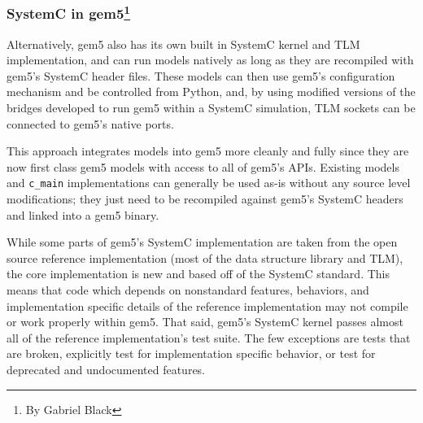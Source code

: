 \subsubsection[SystemC in gem5]{SystemC in gem5\footnote{By Gabriel Black}}

Alternatively, gem5 also has its own built in SystemC kernel and TLM implementation, and can run models natively as long as they are recompiled with gem5's SystemC header files.
These models can then use gem5's configuration mechanism and be controlled from Python, and, by using modified versions of the bridges developed to run gem5 within a SystemC simulation, TLM sockets can be connected to gem5's native ports.

This approach integrates models into gem5 more cleanly and fully since they are now first class gem5 models with access to all of gem5's APIs.
Existing models and \verb|c_main| implementations can generally be used as-is without any source level modifications; they just need to be recompiled against gem5's SystemC headers and linked into a gem5 binary.

While some parts of gem5's SystemC implementation are taken from the open source reference implementation (most of the data structure library and TLM), the core implementation is new and based off of the SystemC standard.
This means that code which depends on nonstandard features, behaviors, and implementation specific details of the reference implementation may not compile or work properly within gem5.
That said, gem5's SystemC kernel passes almost all of the reference implementation's test suite.
The few exceptions are tests that are broken, explicitly test for implementation specific behavior, or test for deprecated and undocumented features.
